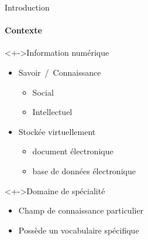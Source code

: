 \begin{frame}{Introduction}\framesubtitle{Contexte}

  \begin{block}<+->{Information numérique}
    \begin{itemize}
      \item{Savoir~/~Connaissance}
      \begin{itemize}
        \item{Social}
        \item{Intellectuel}
      \end{itemize}
      \item{Stockée virtuellement}
      \begin{itemize}
        \item{document électronique}
        \item{base de données électronique}
      \end{itemize}
    \end{itemize}
  \end{block}

  \begin{block}<+->{Domaine de spécialité}
    \begin{itemize}
      \item{Champ de connaissance particulier}
      \item{Possède un vocabulaire spécifique}
    \end{itemize}
  \end{block}
\end{frame}

